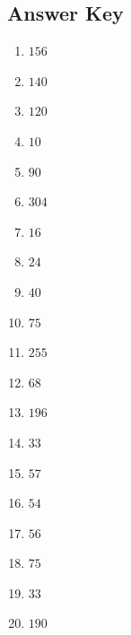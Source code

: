 \documentclass{article}
\begin{document}
\newpage

\subsection*{Answer Key}

\begin{enumerate}
\item $\displaystyle 156 $ \ 
\item $\displaystyle 140 $ \ 
\item $\displaystyle 120 $ \ 
\item $\displaystyle 10 $ \ 
\item $\displaystyle 90 $ \ 
\item $\displaystyle 304 $ \ 
\item $\displaystyle 16 $ \ 
\item $\displaystyle 24 $ \ 
\item $\displaystyle 40 $ \ 
\item $\displaystyle 75 $ \ 
\item $\displaystyle 255 $ \ 
\item $\displaystyle 68 $ \ 
\item $\displaystyle 196 $ \ 
\item $\displaystyle 33 $ \ 
\item $\displaystyle 57 $ \ 
\item $\displaystyle 54 $ \ 
\item $\displaystyle 56 $ \ 
\item $\displaystyle 75 $ \ 
\item $\displaystyle 33 $ \ 
\item $\displaystyle 190 $ \ 

\end{enumerate}
\end{document}
